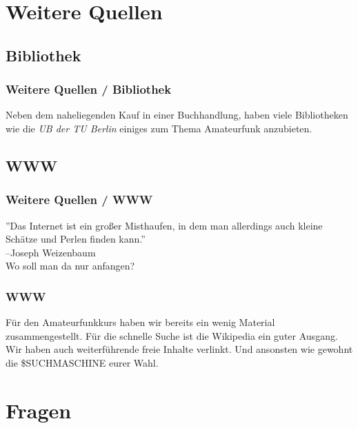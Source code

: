 \section{Weitere Quellen}

\subsection{Bibliothek}
\begin{frame}
    \frametitle{Weitere Quellen / Bibliothek}

    Neben dem naheliegenden Kauf in einer Buchhandlung, haben viele Bibliotheken
    wie die \emph{UB der TU Berlin}\hyperlink{refs}{\cite{ub}} einiges zum Thema
    Amateurfunk anzubieten.

\end{frame}

\subsection{WWW}

\begin{frame}
    \frametitle{Weitere Quellen / WWW}

    ''Das Internet ist ein großer Misthaufen, in dem man allerdings auch kleine
    Schätze und Perlen finden kann.''\hyperlink{refs}{\cite{quote}} \\[1em]
    \flushright --Joseph Weizenbaum \\[4em]

    \center Wo soll man da nur anfangen?

\end{frame}

\begin{frame}
    \frametitle{WWW}

    Für den Amateurfunkkurs haben wir bereits ein wenig
    Material\hyperlink{refs}{\cite{mat}} zusammengestellt. Für die schnelle
    Suche ist die Wikipedia\hyperlink{refs}{\cite{wp}} ein guter Ausgang. \\[2em]

    Wir haben auch weiterführende freie Inhalte\hyperlink{refs}{\cite{fi}}
    verlinkt. Und ansonsten wie gewohnt die \$SUCHMASCHINE eurer Wahl.

\end{frame}

\section{Fragen}


